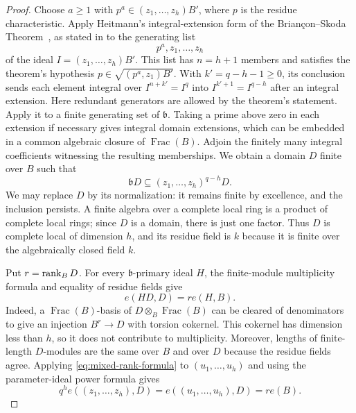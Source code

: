 \begin{proof}
Choose $a\geq1$ with $p^a\in(z_1,\ldots,z_h)B'$, where $p$ is
the residue characteristic.  Apply Heitmann's integral-extension
form of the Brian\c{c}on--Skoda Theorem~\cite{Heitmann}, as stated in
\cite[Proposition~2.8]{HeitmannMa} to the generating list
\[
 p^a,z_1,\ldots,z_h
\]
of the ideal $I=(z_1,\ldots,z_h)B'$.  This list has $n=h+1$
members and satisfies the theorem's hypothesis
$p\in\sqrt{(p^a,z_1)B'}$.  With $k'=q-h-1\geq0$, its conclusion
sends each element integral over $I^{n+k'}=I^q$ into
$I^{k'+1}=I^{q-h}$ after an integral extension.
Here redundant generators are allowed by the theorem's statement.
Apply it to a finite generating set of $\mathfrak b$.  Taking a
prime above zero in each extension if necessary gives integral
domain extensions, which can be embedded in a common algebraic
closure of $\operatorname{Frac}(B)$.  Adjoin the finitely many
integral coefficients witnessing the resulting memberships.
We obtain a domain $D$ finite over $B$ such that
\begin{equation}\label{eq:mixed-deep-entries}
 \mathfrak bD\subseteq(z_1,\ldots,z_h)^{q-h}D.
\end{equation}
We may replace $D$ by its normalization: it remains finite by
excellence, and the inclusion persists.  A finite algebra over a
complete local ring is a product of complete local rings; since
$D$ is a domain, there is just one factor.  Thus $D$ is complete
local of dimension $h$, and its residue field is $k$ because it
is finite over the algebraically closed field $k$.

Put $r=\operatorname{rank}_B D$.  For every $\mathfrak b$-primary ideal $H$,
the finite-module multiplicity formula and equality of residue
fields give
\begin{equation}\label{eq:mixed-rank-formula}
 e(HD,D)=r e(H,B).
\end{equation}
Indeed, a $\operatorname{Frac}(B)$-basis of
$D\otimes_B\operatorname{Frac}(B)$ can be
cleared of denominators to give an injection $B^r\longrightarrow D$
with torsion cokernel.  This cokernel has dimension less than $h$,
so it does not contribute to multiplicity.  Moreover, lengths of
finite-length $D$-modules are the same over $B$ and over $D$ because
the residue fields agree.  Applying
\eqref{eq:mixed-rank-formula} to $(u_1,\ldots,u_h)$ and using the
parameter-ideal power formula gives
\begin{equation}\label{eq:mixed-mu-normalization}
 q^h e((z_1,\ldots,z_h),D)
 =e((u_1,\ldots,u_h),D)=r e(B).
\end{equation}


\end{proof}
